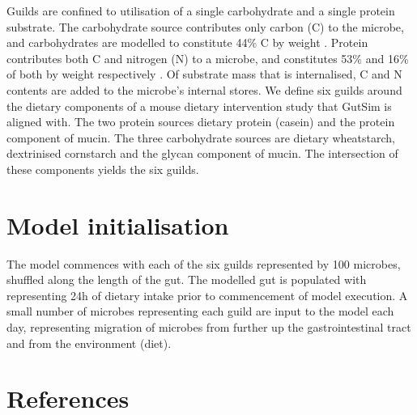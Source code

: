 \documentclass{article}
\begin{document}
Guilds are confined to utilisation of a single carbohydrate and a single protein substrate.
The carbohydrate source contributes only carbon (C) to the microbe, and carbohydrates are modelled to constitute 44\% C by weight \cite{Rouwenhorst1991}. 
Protein contributes both C and nitrogen (N) to a microbe, and constitutes 53\% and 16\% of both by weight respectively \cite{Rouwenhorst1991}.
Of substrate mass that is internalised, C and N contents are added to the microbe's internal stores. 
We define six guilds around the dietary components of a mouse dietary intervention study that GutSim is aligned with. 
The two protein sources dietary protein (casein) and the protein component of mucin. 
The three carbohydrate sources are dietary wheatstarch, dextrinised cornstarch and the glycan component of mucin. 
The intersection of these components yields the six guilds. 

\section{Model initialisation}

The model commences with each of the six guilds represented by 100 microbes, shuffled along the length of the gut. 
The modelled gut is populated with \nutstores representing 24h of dietary intake prior to commencement of model execution. 
A small number of microbes representing each guild are input to the model each day, representing migration of microbes from further up the gastrointestinal tract and from the environment (diet). 


\section{References}


\end{document}
